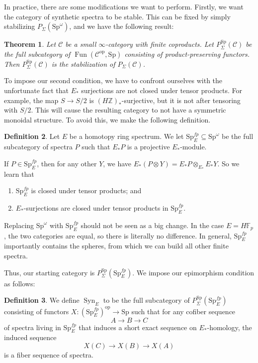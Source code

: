 \documentclass{shortart}
\newtheorem{thm}{Theorem}[section]
\theoremstyle{definition}
\newtheorem{defi}[thm]{Definition}
\newcommand\C{{\mathcal{C}}}
\newcommand\Z{{\mathbb{Z}}}
\newcommand\F{{\mathbb{F}}}
\newcommand\Sp{{\mathrm{Sp}}}
\newcommand\op{{\mathrm{op}}}
\DeclareMathOperator\Fun{Fun}
\DeclareMathOperator\Syn{Syn}
\begin{document}
In practice, there are some modifications we want to perform. Firstly, we want the category of synthetic spectra to be stable. This can be fixed by simply stabilizing $P_\Sigma(\Sp^\omega)$, and we have the following result:

\begin{thm}
  Let $\C$ be a small $\infty$-category with finite coproducts. Let $P_\Sigma^\Sp(\C)$ be the full subcategory of $\Fun(\C^\op, \Sp)$ consisting of product-preserving functors. Then $P_\Sigma^\Sp(\C)$ is the stabilization of $P_\Sigma(\C)$.
\end{thm}

To impose our second condition, we have to confront ourselves with the unfortunate fact that $E_*$ surjections are not closed under tensor products. For example, the map $S \to S/2$ is $(H\Z)_*$-surjective, but it is not after tensoring with $S/2$. This will cause the resulting category to not have a symmetric monoidal structure. To avoid this, we make the following definition.

\begin{defi}
  Let $E$ be a homotopy ring spectrum. We let $\Sp_E^{fp} \subseteq \Sp^\omega$ be the full subcategory of spectra $P$ such that $E_*P$ is a projective $E_*$-module.
\end{defi}

If $P \in \Sp_E^{fp}$, then for any other $Y$, we have $E_*(P \otimes Y) = E_* P \otimes_{E_*} E_* Y$. So we learn that
\begin{enumerate}
  \item $\Sp_E^{fp}$ is closed under tensor products; and
  \item $E_*$-surjections are closed under tensor products in $\Sp_E^{fp}$.
\end{enumerate}

Replacing $\Sp^\omega$ with $\Sp_E^{fp}$ should not be seen as a big change. In the case $E = H\F_p$, the two categories are equal, so there is literally no difference. In general, $\Sp_E^{fp}$ importantly contains the spheres, from which we can build all other finite spectra.

Thus, our starting category is $P_\Sigma^\Sp(\Sp_E^{fp})$. We impose our epimorphism condition as follows:

\begin{defi}
  We define $\Syn_E$ to be the full subcategory of $P_\Sigma^\Sp(\Sp_E^{fp})$ consisting of functors $X \colon (\Sp_E^{fp})^\op \to \Sp$ such that for any cofiber sequence
  \[
    A \to B \to C
  \]
  of spectra living in $\Sp_E^{fp}$ that induces a short exact sequence on $E_*$-homology, the induced sequence
  \[
    X(C) \to X(B) \to X(A)
  \]
  is a fiber sequence of spectra.
\end{defi}
\end{document}
